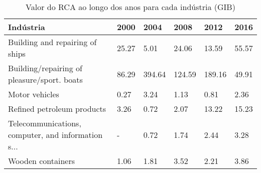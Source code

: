 \begin{table}
\centering
\caption{Valor do RCA ao longo dos anos para cada indústria (GIB)}
\label{tab:ex3-tempo-GIB}
\begin{tabular}{p{6cm}p{1.5cm}p{1.5cm}p{1.5cm}p{1.5cm}p{1.5cm}}
\toprule
                                         Indústria &  2000 &   2004 &   2008 &   2012 &  2016 \\
\midrule
                   Building and repairing of ships & 25.27 &   5.01 &  24.06 &  13.59 & 55.57 \\
       Building/repairing of pleasure/sport. boats & 86.29 & 394.64 & 124.59 & 189.16 & 49.91 \\
                                    Motor vehicles &  0.27 &   3.24 &   1.13 &   0.81 &  2.36 \\
                        Refined petroleum products &  3.26 &   0.72 &   2.07 &  13.22 & 15.23 \\
Telecommunications, computer, and information s... &     - &   0.72 &   1.74 &   2.44 &  3.28 \\
                                 Wooden containers &  1.06 &   1.81 &   3.52 &   2.21 &  3.86 \\
\bottomrule
\end{tabular}
\end{table}
